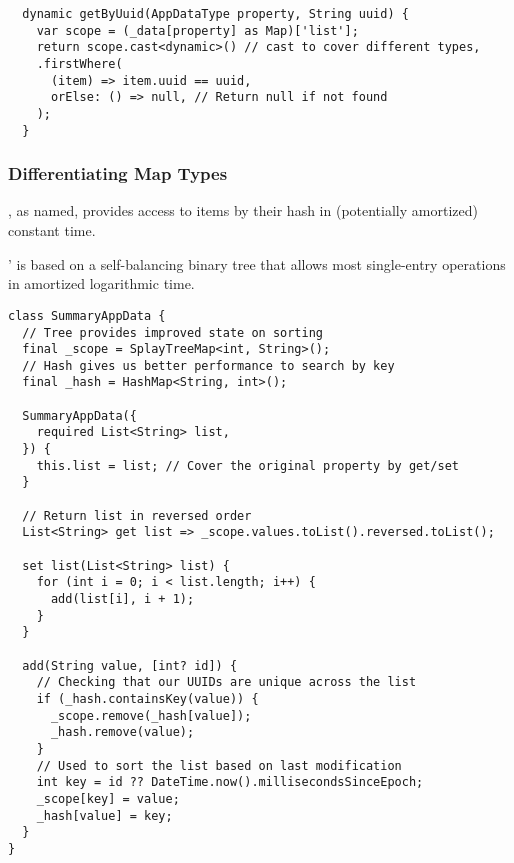 \begin{lstlisting}
  dynamic getByUuid(AppDataType property, String uuid) {
    var scope = (_data[property] as Map)['list'];
    return scope.cast<dynamic>() // cast to cover different types, 
    .firstWhere(
      (item) => item.uuid == uuid,
      orElse: () => null, // Return null if not found
    );
  }
\end{lstlisting}


\subsubsection{Differentiating Map Types}

, as named, provides access to items by their hash in (potentially amortized) constant time.

' is based on a self-balancing binary tree that allows most single-entry operations in amortized 
logarithmic time.

\begin{lstlisting}
class SummaryAppData {
  // Tree provides improved state on sorting
  final _scope = SplayTreeMap<int, String>();
  // Hash gives us better performance to search by key
  final _hash = HashMap<String, int>();

  SummaryAppData({
    required List<String> list,
  }) {
    this.list = list; // Cover the original property by get/set
  }

  // Return list in reversed order
  List<String> get list => _scope.values.toList().reversed.toList();

  set list(List<String> list) {
    for (int i = 0; i < list.length; i++) {
      add(list[i], i + 1);
    }
  }

  add(String value, [int? id]) {
    // Checking that our UUIDs are unique across the list
    if (_hash.containsKey(value)) {
      _scope.remove(_hash[value]);
      _hash.remove(value);
    }
    // Used to sort the list based on last modification 
    int key = id ?? DateTime.now().millisecondsSinceEpoch;
    _scope[key] = value;
    _hash[value] = key;
  }
}
\end{lstlisting}